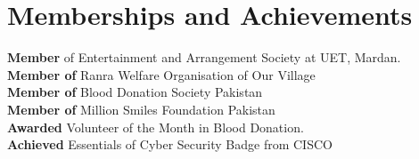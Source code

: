 \documentclass[letterpaper,11pt]{article}
\begin{document}
\section{Memberships and Achievements}
  \begin{itemize}[leftmargin=0.15in, label={}]
    \small{\item{
      \textbf{Member} of Entertainment and Arrangement Society at UET, Mardan. \\
      \textbf{Member of} Ranra Welfare Organisation of Our Village \\
      \textbf{Member of} Blood Donation Society Pakistan \\
      \textbf{Member of} Million Smiles Foundation Pakistan \\
      \textbf{Awarded} Volunteer of the Month in Blood Donation. \\
      \textbf{Achieved} Essentials of Cyber Security Badge from CISCO
    }}
  \end{itemize}
\end{document}
